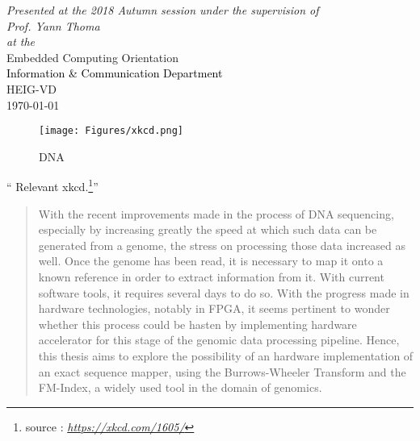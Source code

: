\documentclass[
11pt, %
english, %
singlespacing, %
headsepline, %
]{MastersDoctoralThesis} %
\begin{document}
\begin{titlepage}
\begin{center}
\large \textit{Presented at the 2018 Autumn session under the supervision \linebreak of \\ \vspace*{3mm} Prof. Yann Thoma}\\[0.3cm] %
\textit{at the}\\[0.4cm]\textcolor{bleu}{
Embedded Computing Orientation \\ \vspace*{3mm}
\textcolor{black}{Information \& Communication Department} \\ \vspace*{3mm} HEIG-VD}\\[1cm] %
{\large \today}\\ %
\vfill
\end{center}
\end{titlepage}

\thispagestyle{empty}
\newpage

\vspace*{0.2\textheight}


\begin{figure*}[h]
	\centering

	\texttt{[image: Figures/xkcd.png]}
		\captionsetup{labelformat=empty}%
	\caption{DNA}
	\label{XKCD}
\end{figure*}

\noindent\enquote{ Relevant xkcd.\footnote{source : \textit{\href{https://xkcd.com/1605/}{https://xkcd.com/1605/}}}}\bigbreak


\begin{abstract}
\addchaptertocentry{\abstractname{}} %
With the recent improvements made in the process of DNA sequencing, especially by increasing greatly the speed at which such data can be generated from a genome, the stress on processing those data increased as well. Once the genome has been read, it is necessary to map it onto a known reference in order to extract information from it. With current software tools, it requires several days to do so. With the progress made in hardware technologies, notably in FPGA, it seems pertinent to wonder whether this process could be hasten by implementing hardware accelerator for this stage of the genomic data processing pipeline. Hence, this thesis aims to explore the possibility of an hardware implementation of an exact sequence mapper, using the Burrows-Wheeler Transform and the FM-Index, a widely used tool in the domain of genomics.
\end{abstract}
\end{document}
